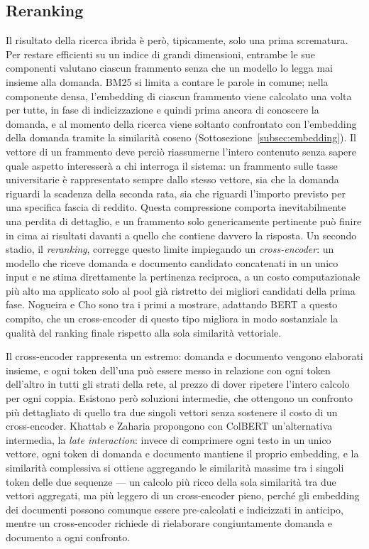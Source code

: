 \subsection{Reranking}

Il risultato della ricerca ibrida è però, tipicamente, solo una prima scrematura. Per restare efficienti su un
indice di grandi dimensioni, entrambe le sue componenti valutano ciascun frammento senza che un modello lo legga
mai insieme alla domanda. BM25 si limita a contare le parole in comune; nella componente densa, l'embedding di
ciascun frammento viene calcolato una volta per tutte, in fase di indicizzazione e quindi prima ancora di conoscere
la domanda, e al momento della ricerca viene soltanto confrontato con l'embedding della domanda tramite la
similarità coseno (Sottosezione~\ref{subsec:embedding}). Il vettore di un frammento deve perciò riassumerne l'intero
contenuto senza sapere quale aspetto interesserà a chi interroga il sistema: un frammento sulle tasse universitarie
è rappresentato sempre dallo stesso vettore, sia che la domanda riguardi la scadenza della seconda rata, sia che
riguardi l'importo previsto per una specifica fascia di reddito. Questa compressione comporta inevitabilmente una
perdita di dettaglio, e un frammento solo genericamente pertinente può finire in cima ai risultati davanti a quello
che contiene davvero la risposta. Un secondo stadio, il \emph{reranking}, corregge questo limite impiegando un
\emph{cross-encoder}: un modello che riceve domanda e documento candidato concatenati in un unico input e ne stima
direttamente la pertinenza reciproca, a un costo computazionale più alto ma applicato solo al pool già ristretto dei
migliori candidati della prima fase. Nogueira e Cho \cite{nogueira2019bert} sono tra i primi a mostrare, adattando
BERT a questo compito, che un cross-encoder di questo tipo migliora in modo sostanziale la qualità del ranking finale
rispetto alla sola similarità vettoriale.

Il cross-encoder rappresenta un estremo: domanda e documento vengono elaborati insieme, e ogni token dell'una
può essere messo in relazione con ogni token dell'altro in tutti gli strati della rete, al prezzo di dover
ripetere l'intero calcolo per ogni coppia. Esistono però soluzioni intermedie, che ottengono un confronto più dettagliato di
quello tra due singoli vettori senza sostenere il costo di un cross-encoder. Khattab e Zaharia \cite{khattab2020colbert} propongono
con ColBERT un'alternativa intermedia, la \emph{late interaction}: invece di comprimere ogni testo in un unico
vettore, ogni token di domanda e documento mantiene il proprio embedding, e la similarità complessiva si ottiene
aggregando le similarità massime tra i singoli token delle due sequenze --- un calcolo più ricco della sola
similarità tra due vettori aggregati, ma più leggero di un cross-encoder pieno, perché gli embedding dei documenti
possono comunque essere pre-calcolati e indicizzati in anticipo, mentre un cross-encoder richiede di rielaborare
congiuntamente domanda e documento a ogni confronto.